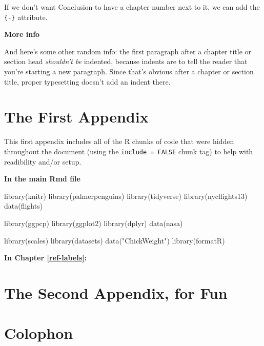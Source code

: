 \documentclass[print]{nuthesis}
\newenvironment{Shaded}{\begin{snugshade}}{\end{snugshade}}
\newcommand{\FunctionTok}[1]{\textcolor[rgb]{0.00,0.00,0.00}{#1}}
\newcommand{\NormalTok}[1]{#1}
\newcommand{\StringTok}[1]{\textcolor[rgb]{0.31,0.60,0.02}{#1}}
\begin{document}
If we don't want Conclusion to have a chapter number next to it, we can add the \texttt{\{-\}} attribute.

\textbf{More info}

And here's some other random info: the first paragraph after a chapter title or section head \emph{shouldn't be} indented, because indents are to tell the reader that you're starting a new paragraph. Since that's obvious after a chapter or section title, proper typesetting doesn't add an indent there.

\appendix

\hypertarget{the-first-appendix}{%
\chapter{The First Appendix}\label{the-first-appendix}}

This first appendix includes all of the R chunks of code that were hidden throughout the document (using the \texttt{include\ =\ FALSE} chunk tag) to help with readibility and/or setup.

\textbf{In the main Rmd file}

\begin{Shaded}
\begin{Highlighting}[]
\FunctionTok{library}\NormalTok{(knitr)}
\FunctionTok{library}\NormalTok{(palmerpenguins)}
\FunctionTok{library}\NormalTok{(tidyverse)}
\FunctionTok{library}\NormalTok{(nycflights13)}
\FunctionTok{data}\NormalTok{(flights)}

\FunctionTok{library}\NormalTok{(ggpcp)}
\FunctionTok{library}\NormalTok{(ggplot2)}
\FunctionTok{library}\NormalTok{(dplyr)}
\FunctionTok{data}\NormalTok{(nasa)}

\FunctionTok{library}\NormalTok{(scales)}
\FunctionTok{library}\NormalTok{(datasets)}
\FunctionTok{data}\NormalTok{(}\StringTok{"ChickWeight"}\NormalTok{)}
\FunctionTok{library}\NormalTok{(formatR)}
\end{Highlighting}
\end{Shaded}

\textbf{In Chapter \ref{ref-labels}:}

\hypertarget{the-second-appendix-for-fun}{%
\chapter{The Second Appendix, for Fun}\label{the-second-appendix-for-fun}}

\hypertarget{colophon}{%
\chapter*{Colophon}\label{colophon}}
\end{document}
